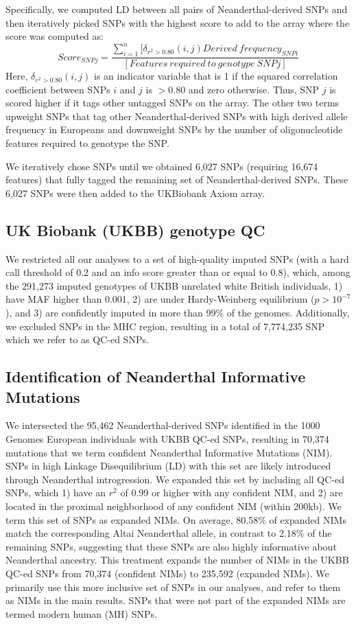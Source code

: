 Specifically, we computed LD between all pairs of Neanderthal-derived SNPs and then iteratively picked SNPs with the highest score to add to the array where the score was computed as:
$$Score_{SNP j} = \frac{\sum_{i=1}^n [\delta_{r^2>0.80} (i,j)Derived\ frequency_{SNP i}}{[Features\ required\ to\ genotype\ SNP j]}$$
Here, $\delta_{r^2>0.80} (i,j)$ is an indicator variable that is 1 if the squared correlation coefficient between SNPs $i$ and $j$ is $>0.80$ and zero otherwise. Thus, SNP $j$ is scored higher if it tags other untagged SNPs on the array. The other two terms upweight SNPs that tag other Neanderthal-derived SNPs with high derived allele frequency in Europeans and downweight SNPs by the number of oligonucleotide features required to genotype the SNP.

We iteratively chose SNPs until we obtained 6,027 SNPs (requiring 16,674 features) that fully tagged the remaining set of Neanderthal-derived SNPs. These 6,027 SNPs were then added to the UKBiobank Axiom array.

\subsection{UK Biobank (UKBB) genotype QC}
\label{3.3.2}
We restricted all our analyses to a set of high-quality imputed SNPs (with a hard call threshold of 0.2 and an info score greater than or equal to 0.8), which, among the 291,273 imputed genotypes of UKBB unrelated white British individuals, 1) have MAF higher than 0.001, 2) are under Hardy-Weinberg equilibrium ($p > 10^{-7}$), and 3) are confidently imputed in more than 99\% of the genomes. Additionally, we excluded SNPs in the MHC region, resulting in a total of 7,774,235 SNP which we refer to as QC-ed SNPs. 

\subsection{Identification of Neanderthal Informative Mutations}
\label{3.3.3}
We intersected the 95,462 Neanderthal-derived SNPs identified in the 1000 Genomes European individuals with UKBB QC-ed SNPs, resulting in 70,374 mutations that we term confident Neanderthal Informative Mutations (NIM). SNPs in high Linkage Disequilibrium (LD) with this set are likely introduced through Neanderthal introgression. We expanded this set by including all QC-ed SNPs, which 1) have an $r^2$ of 0.99 or higher with any confident NIM, and 2) are located in the proximal neighborhood of any confident NIM (within 200kb). We term this set of SNPs as expanded NIMs. On average, 80.58\% of expanded NIMs match the corresponding Altai Neanderthal allele, in contrast to 2.18\% of the remaining SNPs, suggesting that these SNPs are also highly informative about Neanderthal ancestry. This treatment expands the number of NIMs in the UKBB QC-ed SNPs from 70,374 (confident NIMs) to 235,592 (expanded NIMs). We primarily use this more inclusive set of SNPs in our analyses, and refer to them as NIMs in the main results. SNPs that were not part of the expanded NIMs are termed modern human (MH) SNPs.

